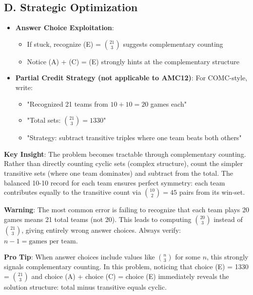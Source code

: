 \documentclass[]{article}
\begin{document}
\begin{competitionbox}
\subsection*{D. Strategic Optimization}
\begin{itemize}[leftmargin=*]
    \item \textbf{Answer Choice Exploitation}:
    \begin{itemize}
        \item If stuck, recognize (E) = $\binom{21}{3}$ suggests complementary counting
        \item Notice (A) + (C) = (E) strongly hints at the complementary structure
    \end{itemize}
    \item \textbf{Partial Credit Strategy (not applicable to AMC12)}: For COMC-style, write:
    \begin{itemize}
        \item "Recognized 21 teams from $10+10=20$ games each"
        \item "Total sets: $\binom{21}{3} = 1330$"
        \item "Strategy: subtract transitive triples where one team beats both others"
    \end{itemize}
\end{itemize}
\end{competitionbox}

\begin{keyinsightbox}
\textbf{Key Insight}: The problem becomes tractable through complementary counting. Rather than directly counting cyclic sets (complex structure), count the simpler transitive sets (where one team dominates) and subtract from the total. The balanced 10-10 record for each team ensures perfect symmetry: each team contributes equally to the transitive count via $\binom{10}{2} = 45$ pairs from its win-set.
\end{keyinsightbox}

\begin{warningbox}
\textbf{Warning}: The most common error is failing to recognize that each team plays 20 games means 21 total teams (not 20). This leads to computing $\binom{20}{3}$ instead of $\binom{21}{3}$, giving entirely wrong answer choices. Always verify: $n-1 = \text{games per team}$.
\end{warningbox}

\begin{tipbox}
\textbf{Pro Tip}: When answer choices include values like $\binom{n}{3}$ for some $n$, this strongly signals complementary counting. In this problem, noticing that choice (E) = 1330 = $\binom{21}{3}$ and choice (A) + choice (C) = choice (E) immediately reveals the solution structure: total minus transitive equals cyclic.
\end{tipbox}
\end{document}
